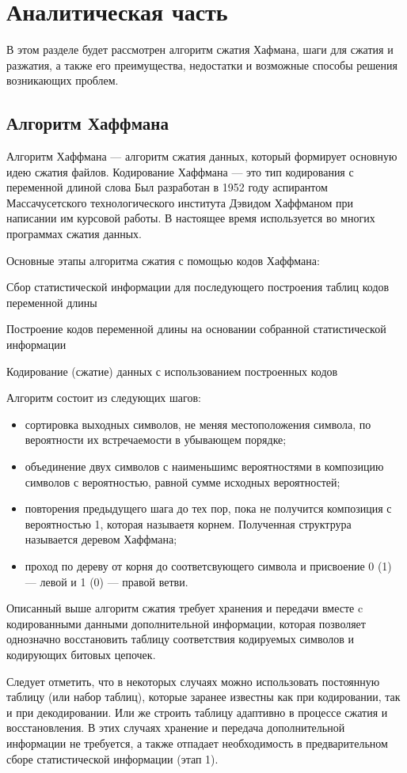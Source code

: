 \chapter{Аналитическая часть}

В этом разделе будет рассмотрен алгоритм сжатия Хафмана, шаги для сжатия и разжатия, а также его преимущества, недостатки и возможные способы решения возникающих проблем.

\section{Алгоритм Хаффмана}

Алгоритм Хаффмана --- алгоритм сжатия данных, который формирует основную идею сжатия файлов. 
Кодирование Хаффмана --- это тип кодирования с переменной длиной слова
Был разработан в 1952 году аспирантом Массачусетского технологического института Дэвидом Хаффманом при написании им курсовой работы. 
В настоящее время используется во многих программах сжатия данных.

Основные этапы алгоритма сжатия с помощью кодов Хаффмана:

Сбор статистической информации для последующего построения таблиц кодов переменной длины

Построение кодов переменной длины на основании собранной статистической информации

Кодирование (сжатие) данных с использованием построенных кодов

Алгоритм состоит из следующих шагов:
\begin{itemize}
	\item сортировка выходных символов, не меняя местоположения символа, по вероятности их встречаемости в убывающем порядке;
	\item объединение двух символов с наименьшимс вероятностями в композицию символов с вероятностью, равной сумме исходных вероятностей;
	\item повторения предыдущего шага до тех пор, пока не получится композиция с вероятностью 1, которая называетя корнем. Полученная структрура называется деревом Хаффмана;
	\item проход по дереву от корня до соответсвующего символа и присвоение 0 (1) --- левой и 1 (0) --- правой ветви. 
\end{itemize}

Описанный выше алгоритм сжатия требует хранения и передачи вместе c кодированными данными дополнительной информации, которая позволяет однозначно восстановить таблицу соответствия кодируемых символов и кодирующих битовых цепочек.

Следует отметить, что в некоторых случаях можно использовать постоянную таблицу (или набор таблиц), которые заранее известны как при кодировании, так и при декодировании. Или же строить таблицу адаптивно в процессе сжатия и восстановления. В этих случаях хранение и передача дополнительной информации не требуется, а также отпадает необходимость в предварительном сборе статистической информации (этап 1).



